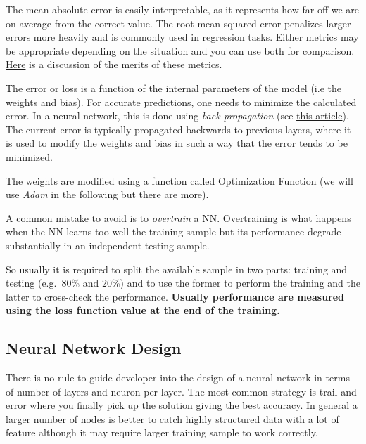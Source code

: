 The mean absolute error is easily interpretable, as it represents how
far off we are on average from the correct value. The root mean squared
error penalizes larger errors more heavily and is commonly used in
regression tasks. Either metrics may be appropriate depending on the
situation and you can use both for comparison.
\href{https://medium.com/human-in-a-machine-world/mae-and-rmse-which-metric-is-better-e60ac3bde13d}{Here}
is a discussion of the merits of these metrics.

The error or loss is a function of the internal parameters of the model
(i.e the weights and bias). For accurate predictions, one needs to
minimize the calculated error. In a neural network, this is done using
\emph{back propagation} (see
\href{https://towardsdatascience.com/understanding-backpropagation-algorithm-7bb3aa2f95fd}{this article}).
The current error is typically propagated backwards to previous layers,
where it is used to modify the weights and bias in such
a way that the error tends to be minimized.

The weights are modified using a function called Optimization Function
(we will use \emph{Adam} in the following but there are
more).


A common mistake to avoid is to \emph{overtrain} a NN. Overtraining is
what happens when the NN learns too well the training sample but its
performance degrade substantially in an independent testing sample.

So usually it is required to split the available sample in two parts:
training and testing (e.g.~80\% and 20\%) and to use the former to
perform the training and the latter to cross-check the performance.
\textbf{Usually performance are measured using the loss function value
	at the end of the training.}

\subsection{Neural Network Design}\label{neural-network-design}

There is no rule to guide developer into the design of a neural network
in terms of number of layers and neuron per layer. The most common
strategy is trail and error where you finally pick up the solution
giving the best accuracy. In general a larger number of nodes is better
to catch highly structured data with a lot of feature although it may
require larger training sample to work correctly.


